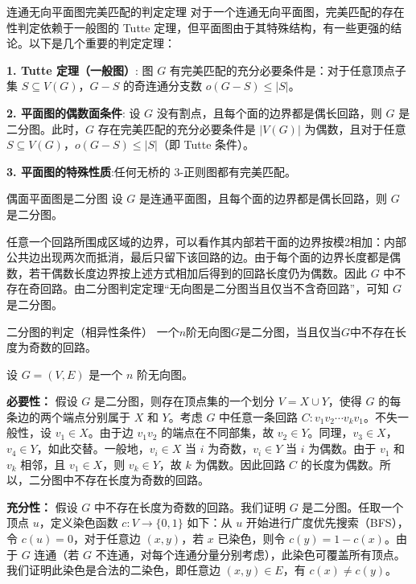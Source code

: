 \documentclass[lang=cn,11pt]{elegantbook}
\begin{document}
\begin{theorem}{连通无向平面图完美匹配的判定定理}
    对于一个连通无向平面图，完美匹配的存在性判定依赖于一般图的 Tutte 定理，但平面图由于其特殊结构，有一些更强的结论。以下是几个重要的判定定理：

    \textbf{1. Tutte 定理（一般图）}:
    图 $G$ 有完美匹配的充分必要条件是：对于任意顶点子集 $S \subseteq V(G)$，$G-S$ 的奇连通分支数 $o(G-S) \le |S|$。

    \textbf{2. 平面图的偶数面条件}:
    设 $G$ 没有割点，且每个面的边界都是偶长回路，则 $G$ 是二分图。此时，$G$ 存在完美匹配的充分必要条件是 $|V(G)|$ 为偶数，且对于任意 $S \subseteq V(G)$，$o(G-S) \le |S|$（即 Tutte 条件）。

    \textbf{3. 平面图的特殊性质}:任何无桥的 3-正则图都有完美匹配。
\end{theorem}
\begin{theorem}{偶面平面图是二分图}
    设 $G$ 是连通平面图，且每个面的边界都是偶长回路，则 $G$ 是二分图。
\end{theorem}
    任意一个回路所围成区域的边界，可以看作其内部若干面的边界按模2相加：内部公共边出现两次而抵消，最后只留下该回路的边。由于每个面的边界长度都是偶数，若干偶数长度边界按上述方式相加后得到的回路长度仍为偶数。因此 $G$ 中不存在奇回路。由二分图判定定理“无向图是二分图当且仅当不含奇回路”，可知 $G$ 是二分图。

\begin{theorem}{二分图的判定（相异性条件）}
    一个$n$阶无向图$G$是二分图，当且仅当$G$中不存在长度为奇数的回路。
\end{theorem}
设 $G=(V,E)$ 是一个 $n$ 阶无向图。

    \textbf{必要性：} 假设 $G$ 是二分图，则存在顶点集的一个划分 $V = X \cup Y$，使得 $G$ 的每条边的两个端点分别属于 $X$ 和 $Y$。考虑 $G$ 中任意一条回路 $C: v_1 v_2 \cdots v_k v_1$。不失一般性，设 $v_1 \in X$。由于边 $v_1v_2$ 的端点在不同部集，故 $v_2 \in Y$。同理，$v_3 \in X$，$v_4 \in Y$，如此交替。一般地，$v_i \in X$ 当 $i$ 为奇数，$v_i \in Y$ 当 $i$ 为偶数。由于 $v_1$ 和 $v_k$ 相邻，且 $v_1 \in X$，则 $v_k \in Y$，故 $k$ 为偶数。因此回路 $C$ 的长度为偶数。所以，二分图中不存在长度为奇数的回路。

    \textbf{充分性：} 假设 $G$ 中不存在长度为奇数的回路。我们证明 $G$ 是二分图。任取一个顶点 $u$，定义染色函数 $c: V \to \{0,1\}$ 如下：从 $u$ 开始进行广度优先搜索（BFS），令 $c(u)=0$，对于任意边 $(x,y)$，若 $x$ 已染色，则令 $c(y)=1-c(x)$。由于 $G$ 连通（若 $G$ 不连通，对每个连通分量分别考虑），此染色可覆盖所有顶点。我们证明此染色是合法的二染色，即任意边 $(x,y) \in E$，有 $c(x) \neq c(y)$。
\end{document}
